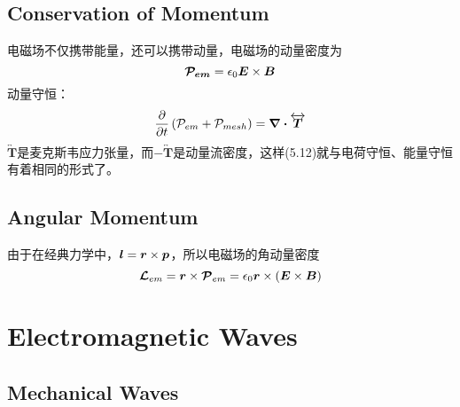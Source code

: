 \documentclass[14pt,oneside]{book}
\begin{document}
\begin{large}
\section{Conservation of Momentum}
电磁场不仅携带能量，还可以携带动量，电磁场的动量密度为
\begin{equation}
  \vb*{\mathcal{P}_{em}}=\epsilon_0 \vb*{E}\times \vb*{B}
\end{equation}
动量守恒：
\begin{equation}
  \pdv{}{t} \left(\mathcal{P}_{em}+\mathcal{P}_{mesh}\right)=\div{\overleftrightarrow{\boldsymbol{T}}}
\end{equation}
$\overleftrightarrow{\boldsymbol{T}}$是麦克斯韦应力张量，而$-\overleftrightarrow{\boldsymbol{T}}$是动量流密度，这样(5.12)就与电荷守恒、能量守恒有着相同的形式了。
\section{Angular Momentum}
由于在经典力学中，$\vb*{l}=\vb*{r}\times \vb*{p}$，所以电磁场的角动量密度
\begin{equation}
  \vb*{\mathcal{L}}_{em}=\vb*{r}\times \vb*{\mathcal{P}}_{em}=\epsilon_0 \vb*{r}\times(\vb*{E}\times \vb*{B})
\end{equation}

\chapter{Electromagnetic Waves}
\section{Mechanical Waves}

\end{large}
\end{document}
